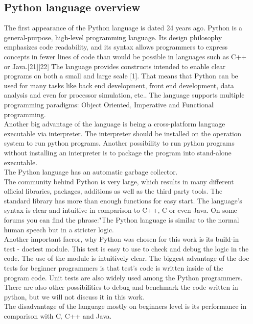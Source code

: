 \documentclass{article}
\begin{document}
\newpage
\subsection{Python language overview}
The first appearance of the Python language is dated 24 years ago. Python is a general-purpose, high-level programming language. Its design philosophy emphasizes code readability, and its syntax allows programmers to express concepts in fewer lines of code than would be possible in languages such as C++ or Java.[21][22] The language provides constructs intended to enable clear programs on both a small and large scale [1]. That means that Python can be used for many tasks like back end development, front end development, data analysis and even for processor simulation, etc.. The language supports multiple programming paradigms: Object Oriented, Imperative and Functional programming.\\
Another big advantage of the language is being a cross-platform language executable via interpreter. The interpreter should be installed on the operation system to run python programs. Another possibility to run python programs without installing an interpreter is to package the program into stand-alone executable.\\ 
The Python language has an automatic garbage collector.\\
The community behind Python is very large, which results in many different official libraries, packages, additions as well as the third party tools. The standard library has more than enough functions for easy start. The language's syntax is clear and intuitive in comparison to C++, C or even Java. On some forums you can find the phrase:"The Python language is similar to the normal human speech but in a stricter logic.\\
Another important facror, why Python was chosen for this work is its build-in test - doctest module. This test is easy to use to check and debug the logic in the code. The use of the module is intuitively clear. The biggest advantage of the doc tests for beginner programmers is that test's code is written inside of the program code. Unit tests are also widely used among the Python programmers. There are also other possibilities to debug and benchmark the code written in python, but we will not discuss it in this work.\\
The disadvantage of the language mostly on beginners level is its performance in comparison with C, C++ and Java. \\
\end{document}
